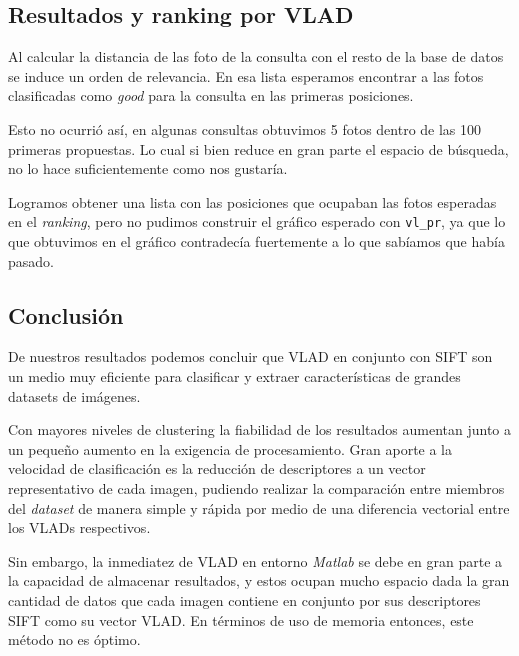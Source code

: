 \subsection{Resultados y ranking por VLAD}

Al calcular la distancia de las foto de la consulta con el resto de la base de datos se induce un orden de relevancia.
En esa lista esperamos encontrar a las fotos clasificadas como \emph{good} para la consulta en las primeras posiciones.

Esto no ocurrió así, en algunas consultas obtuvimos 5 fotos dentro de las 100 primeras propuestas. Lo cual si bien reduce en gran parte el espacio de búsqueda, no lo hace suficientemente como nos gustaría.

Logramos obtener una lista con las posiciones que ocupaban las fotos esperadas en el \emph{ranking}, pero no pudimos construir el gráfico esperado con \texttt{vl\_pr}, ya que lo que obtuvimos en el gráfico contradecía fuertemente a lo que sabíamos que había pasado.




\subsection{Conclusión}


De nuestros resultados podemos concluir que VLAD en conjunto con SIFT son un medio muy eficiente para clasificar y extraer características de grandes datasets de imágenes.

Con mayores niveles de clustering la fiabilidad de los resultados aumentan junto a un pequeño aumento en la exigencia de procesamiento. Gran aporte a la velocidad de clasificación es la reducción de descriptores a un vector representativo de cada imagen, pudiendo realizar la comparación entre miembros del \emph{dataset} de manera simple y rápida por medio de una diferencia vectorial entre los VLADs respectivos.

Sin embargo, la inmediatez de VLAD en entorno \emph{Matlab} se debe en gran parte a la capacidad de almacenar resultados, y estos ocupan mucho espacio dada la gran cantidad de datos que cada imagen contiene en conjunto por sus descriptores SIFT como su vector VLAD. En términos de uso de memoria entonces, este método no es óptimo.
